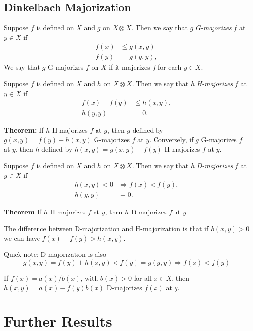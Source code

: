 \documentclass[
  12pt,
]{book}
\begin{document}
\hypertarget{dinkelbach-majorization}{%
\subsection{Dinkelbach Majorization}\label{dinkelbach-majorization}}

Suppose \(f\) is defined on \(X\) and \(g\) on \(X\otimes X\). Then we
say that \(g\) \emph{G-majorizes} \(f\) at \(y\in X\) if
\begin{align*}
f(x)&\leq g(x,y),\\
f(y)&= g(y,y),
\end{align*}
We say that \(g\) G-majorizes \(f\) on \(X\) if it majorizes \(f\) for each \(y\in X\).

Suppose \(f\) is defined on \(X\) and \(h\) on \(X\otimes X\). Then we
say that \(h\) \emph{H-majorizes} \(f\) at \(y\in X\) if
\begin{align*}
f(x)-f(y)&\leq h(x,y),\\
h(y,y)&=0.
\end{align*}

\textbf{Theorem:} If \(h\) H-majorizes \(f\) at \(y\), then \(g\) defined by \(g(x,y)=f(y)+h(x,y)\) G-majorizes \(f\) at \(y\). Conversely,
if \(g\) G-majorizes \(f\) at \(y\), then \(h\) defined
by \(h(x,y)=g(x,y)-f(y)\) H-majorizes \(f\) at \(y\).

Suppose \(f\) is defined on \(X\) and \(h\) on \(X\otimes X\). Then we
say that \(h\) \emph{D-majorizes} \(f\) at \(y\in X\) if
\begin{align*}
h(x,y) < 0 &\Rightarrow  f(x)<f(y),\\
h(y,y)&=0.
\end{align*}

\textbf{Theorem}
If \(h\) H-majorizes \(f\) at \(y\), then \(h\)
D-majorizes \(f\) at \(y\).

The difference between D-majorization and H-majorization
is that if \(h(x,y)>0\) we can have \(f(x)-f(y)>h(x,y)\).

Quick note: D-majorization is also
\[
g(x,y)=f(y)+h(x,y)<f(y)=g(y,y)\Rightarrow f(x)<f(y)
\]

If \(f(x)=a(x)/b(x)\), with \(b(x)>0\) for all \(x\in X\),
then \(h(x,y)=a(x)-f(y)b(x)\) D-majorizes \(f(x)\) at \(y\).

\hypertarget{further-results}{%
\section{Further Results}\label{further-results}}
\end{document}
